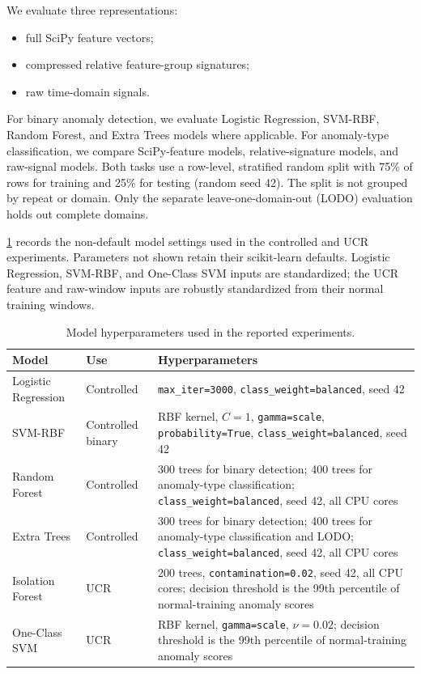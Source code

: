 We evaluate three representations:

\begin{itemize}
    \item full SciPy feature vectors;
    \item compressed relative feature-group signatures;
    \item raw time-domain signals.
\end{itemize}

For binary anomaly detection, we evaluate Logistic Regression, SVM-RBF, Random Forest, and Extra Trees models where applicable. For anomaly-type classification, we compare SciPy-feature models, relative-signature models, and raw-signal models. Both tasks use a row-level, stratified random split with 75\% of rows for training and 25\% for testing (random seed 42). The split is not grouped by repeat or domain. Only the separate leave-one-domain-out (LODO) evaluation holds out complete domains.

\cref{tab:model-hyperparameters} records the non-default model settings used in the controlled and UCR experiments. Parameters not shown retain their scikit-learn defaults. Logistic Regression, SVM-RBF, and One-Class SVM inputs are standardized; the UCR feature and raw-window inputs are robustly standardized from their normal training windows.

\begin{table}[htbp]
\centering
\caption{Model hyperparameters used in the reported experiments.}
\label{tab:model-hyperparameters}
\small
\begin{tabular}{p{}p{}p{}}
\toprule
\textbf{Model} & \textbf{Use} & \textbf{Hyperparameters} \\
\midrule
Logistic Regression & Controlled &
\texttt{max\_iter=3000}, \texttt{class\_weight=balanced}, seed 42 \\
SVM-RBF & Controlled binary &
RBF kernel, \(C=1\), \texttt{gamma=scale}, \texttt{probability=True},
\texttt{class\_weight=balanced}, seed 42 \\
Random Forest & Controlled &
300 trees for binary detection; 400 trees for anomaly-type classification;
\texttt{class\_weight=balanced}, seed 42, all CPU cores \\
Extra Trees & Controlled &
300 trees for binary detection; 400 trees for anomaly-type classification and
LODO; \texttt{class\_weight=balanced}, seed 42, all CPU cores \\
Isolation Forest & UCR &
200 trees, \texttt{contamination=0.02}, seed 42, all CPU cores; decision
threshold is the 99th percentile of normal-training anomaly scores \\
One-Class SVM & UCR &
RBF kernel, \texttt{gamma=scale}, \(\nu=0.02\); decision threshold is the 99th
percentile of normal-training anomaly scores \\
\bottomrule
\end{tabular}
\end{table}

